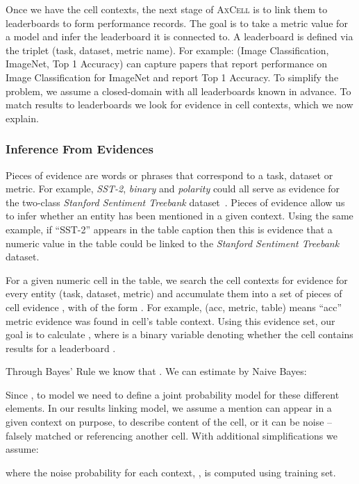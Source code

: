 \documentclass[11pt,a4paper]{article}
\newcommand{\model}{\textsc{AxCell}}
\begin{document}
Once we have the cell contexts, the next stage of \model{} is to link them to leaderboards to form performance records. The goal is to take a metric value for a model and infer the leaderboard it is connected to. A leaderboard is defined via the triplet (task, dataset, metric name). For example: (Image Classification, ImageNet, Top 1 Accuracy) can capture papers that report performance on Image Classification for ImageNet and report Top 1 Accuracy. To simplify the problem, we assume a closed-domain with all leaderboards known in advance.
To match results to leaderboards we look for evidence in cell contexts, which we now explain.

\subsubsection{Inference From Evidences}
\label{sec:linking-inference}

Pieces of evidence are words or phrases that correspond to a task, dataset or metric. For example, \textit{SST-2}, \textit{binary} and \textit{polarity} could all serve as evidence for the two-class \textit{Stanford Sentiment Treebank} dataset~\citep{sst-2}. Pieces of evidence allow us to infer whether an entity has been mentioned in a given context. Using the same example, if ``SST-2'' appears in the table caption then this is evidence that a numeric value in the table could be linked to the \textit{Stanford Sentiment Treebank} dataset.

For a given numeric cell in the table, we search the cell contexts for evidence for every entity (task, dataset, metric) and accumulate them into a set of  pieces of cell evidence , with  of the form . For example, (acc, metric, table) means ``acc'' metric evidence was found in cell's table context. Using this evidence set, our goal is to calculate ,  where  is a binary variable denoting whether the cell contains results for a leaderboard .

Through Bayes' Rule we know that . We can estimate  by Naive Bayes:



Since , to model  we need to define a joint probability model for these different elements. In our results linking model, we assume a mention can appear in a given context on purpose, to describe content of the cell, or it can be noise -- falsely matched or referencing another cell. With additional simplifications we assume:


where the noise probability for each context, , is computed using training set. \\
\end{document}
